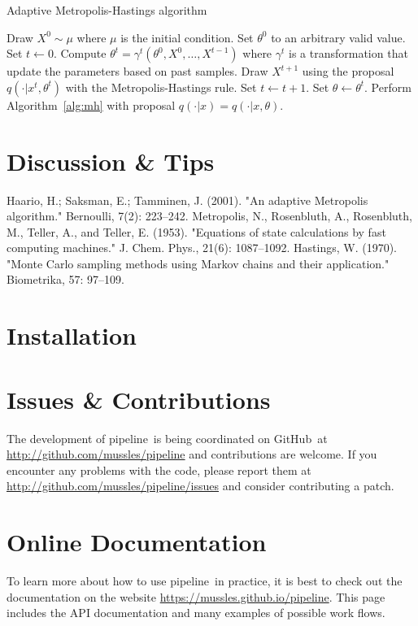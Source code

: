 \documentclass[12pt,preprint]{aastex}
\newcommand{\project}[1]{{\sffamily #1}}
\newcommand{\github}{\project{GitHub}}
\newcommand{\thisplain}{pipeline}
\newcommand{\this}{\project{\thisplain}}
\newcommand{\sectlabel}[1]{\label{sect:#1}}
\begin{document}
\begin{algorithm}
\caption{Adaptive Metropolis-Hastings algorithm}
\label{alg:adaptive_mh}
\begin{algorithmic}
  \STATE Draw $X^0\sim\mu$ where $\mu$ is the initial condition.
  \STATE Set $\theta^0$ to an arbitrary valid value.
  \STATE Set $t\leftarrow0$.
  \REPEAT
      \STATE Compute $\theta^t = \gamma^t(\theta^0,X^0,\dots,X^{t-1})$ where
      $\gamma^t$ is a transformation that update the parameters based on past
      samples.
      \STATE Draw $X^{t + 1}$ using the proposal $q(\cdot|x^t,\theta^t)$ with
      the Metropolis-Hastings rule.
      \STATE Set $t\leftarrow t+1$.
  \STATE Set $\theta\leftarrow\theta^t$.
  \STATE Perform Algorithm~\ref{alg:mh} with proposal $q(\cdot|x) =
  q(\cdot|x,\theta)$.
\end{algorithmic}
\end{algorithm}

\section{Discussion \& Tips}\sectlabel{advice}

\begin{thebibliography}{}\raggedright
{}
    Haario, H.; Saksman, E.; Tamminen, J. (2001). "An adaptive Metropolis algorithm." Bernoulli, 7(2): 223–242.
    Metropolis, N., Rosenbluth, A., Rosenbluth, M., Teller, A., and Teller, E. (1953). "Equations of state calculations by fast computing machines." J. Chem. Phys., 21(6): 1087–1092.
    Hastings, W. (1970). "Monte Carlo sampling methods using Markov chains and their application." Biometrika, 57: 97–109.
\end{thebibliography}

\clearpage
\appendix
\section{Installation}\sectlabel{install}

\section{Issues \& Contributions}

The development of \this\ is being coordinated on \github\ at
\url{http://github.com/mussles/pipeline} and contributions are welcome. If you
encounter any problems with the code, please report them at
\url{http://github.com/mussles/pipeline/issues} and consider
contributing a patch.

\section{Online Documentation}

To learn more about how to use \this\ in practice, it is best to check out the
documentation on the website \url{https://mussles.github.io/pipeline}. This page includes
the API documentation and many examples of possible work flows.
\end{document}
